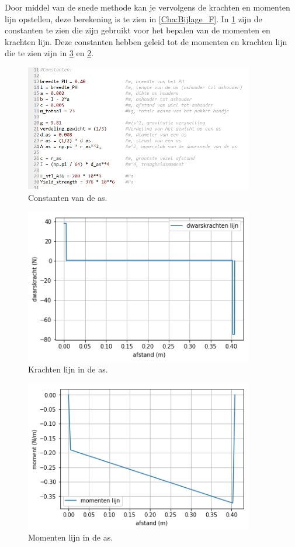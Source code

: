 Door middel van de snede methode kan je vervolgens de krachten en momenten lijn opstellen, deze berekening is te zien in \cref{Cha:Bijlage_F}. In \cref{fig: as_constanten} zijn de constanten te zien die zijn gebruikt voor het bepalen van de momenten en krachten lijn. Deze constanten hebben geleid tot de momenten en krachten lijn die te zien zijn in \cref{fig: Momentenlijn_as} en \cref{fig: Krachtenlijn_as}. \\

\begin{figure}[H]
    \includegraphics[width = 100mm]{04_conceptdimensionering/Constanten_as_goed.PNG}
    \caption{Constanten van de as.}
    \label{fig: as_constanten}
\end{figure}

\begin{figure}[H]
    \includegraphics[width = 100mm]{04_conceptdimensionering/Krachtenlijn_as.png}
    \caption{Krachten lijn in de as.}
    \label{fig: Krachtenlijn_as}
\end{figure}

\begin{figure}[H]
    \includegraphics[width = 100mm]{04_conceptdimensionering/Momentenlijn_as.png}
    \caption{Momenten lijn in de as.}
    \label{fig: Momentenlijn_as}
\end{figure}


